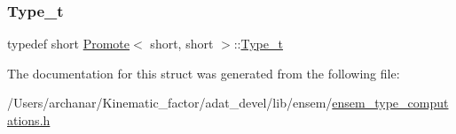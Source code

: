 \subsubsection{\texorpdfstring{Type\_t}{Type\_t}\hspace{0.1cm}{\footnotesize\ttfamily [2/2]}}
{\footnotesize\ttfamily typedef short \mbox{\hyperlink{structPromote}{Promote}}$<$ short, short $>$\+::\mbox{\hyperlink{structPromote_3_01short_00_01short_01_4_a7be01cb6c481989a8d153e69778ac59a}{Type\+\_\+t}}}



The documentation for this struct was generated from the following file\+:\begin{DoxyCompactItemize}
\item 
/\+Users/archanar/\+Kinematic\+\_\+factor/adat\+\_\+devel/lib/ensem/\mbox{\hyperlink{lib_2ensem_2ensem__type__computations_8h}{ensem\+\_\+type\+\_\+computations.\+h}}\end{DoxyCompactItemize}
